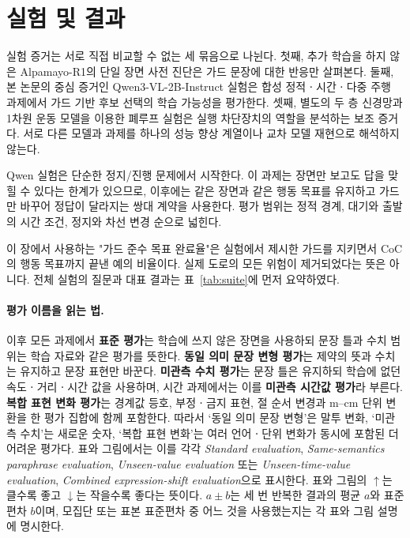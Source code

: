 \section{실험 및 결과}
\label{sec:experiments}

실험 증거는 서로 직접 비교할 수 없는 세 묶음으로 나뉜다. 첫째, 추가 학습을 하지 않은 Alpamayo-R1의 단일 장면 사전 진단은 가드 문장에 대한 반응만 살펴본다. 둘째, 본 논문의 중심 증거인 Qwen3-VL-2B-Instruct 실험은 합성 정적ㆍ시간ㆍ다중 주행 과제에서 가드 기반 후보 선택의 학습 가능성을 평가한다. 셋째, 별도의 두 층 신경망과 1차원 운동 모델을 이용한 폐루프 실험은 실행 차단장치의 역할을 분석하는 보조 증거다. 서로 다른 모델과 과제를 하나의 성능 향상 계열이나 교차 모델 재현으로 해석하지 않는다.

Qwen 실험은 단순한 정지/진행 문제에서 시작한다. 이 과제는 장면만 보고도 답을 맞힐 수 있다는 한계가 있으므로, 이후에는 같은 장면과 같은 행동 목표를 유지하고 가드만 바꾸어 정답이 달라지는 쌍대 계약을 사용한다. 평가 범위는 정적 경계, 대기와 출발의 시간 조건, 정지와 차선 변경 순으로 넓힌다.

이 장에서 사용하는 "가드 준수 목표 완료율"은 실험에서 제시한 가드를 지키면서 CoC의 행동 목표까지 끝낸 예의 비율이다. 실제 도로의 모든 위험이 제거되었다는 뜻은 아니다. 전체 실험의 질문과 대표 결과는 표~\ref{tab:suite}에 먼저 요약하였다.

\paragraph{평가 이름을 읽는 법.}
이후 모든 과제에서 \textbf{표준 평가}는 학습에 쓰지 않은 장면을 사용하되 문장 틀과 수치 범위는 학습 자료와 같은 평가를 뜻한다. \textbf{동일 의미 문장 변형 평가}는 제약의 뜻과 수치는 유지하고 문장 표현만 바꾼다. \textbf{미관측 수치 평가}는 문장 틀은 유지하되 학습에 없던 속도ㆍ거리ㆍ시간 값을 사용하며, 시간 과제에서는 이를 \textbf{미관측 시간값 평가}라 부른다. \textbf{복합 표현 변화 평가}는 경계값 등호, 부정ㆍ금지 표현, 절 순서 변경과 m--cm 단위 변환을 한 평가 집합에 함께 포함한다. 따라서 `동일 의미 문장 변형'은 말투 변화, `미관측 수치'는 새로운 숫자, `복합 표현 변화'는 여러 언어ㆍ단위 변화가 동시에 포함된 더 어려운 평가다. 표와 그림에서는 이를 각각 \textit{Standard evaluation}, \textit{Same-semantics paraphrase evaluation}, \textit{Unseen-value evaluation} 또는 \textit{Unseen-time-value evaluation}, \textit{Combined expression-shift evaluation}으로 표시한다. 표와 그림의 $\uparrow$는 클수록 좋고 $\downarrow$는 작을수록 좋다는 뜻이다. $a\pm b$는 세 번 반복한 결과의 평균 $a$와 표준편차 $b$이며, 모집단 또는 표본 표준편차 중 어느 것을 사용했는지는 각 표와 그림 설명에 명시한다.

